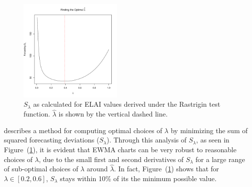 \documentclass{article}
\newcommand{\argmin}{\operatornamewithlimits{argmin}}
\begin{document}
%
%
\begin{figure}
\vspace{-0.2cm}
\includegraphics[width=0.45\textwidth]{./figures/ssRastHardOpt.pdf}
\caption{ 
$S_\lambda$ as calculated for ELAI values derived under the 
Rastrigin test function. $\hat\lambda$ is shown by the vertical dashed line. 
} 
\label{bestL} 
\end{figure}
%
%
\hspace*{1cm}\hspace*{-1.1cm}
%
\cite{boxBook} describes a method for computing optimal choices of $\lambda$ 
by minimizing the sum of squared forecasting deviations ($S_\lambda$).
Through this analysis of $S_\lambda$, as seen in Figure~(\ref{bestL}), it is 
evident that EWMA charts can be very robust to reasonable choices of 
$\lambda$, due to the small first and second derivatives of $S_\lambda$ for a 
large range of sub-optimal choices of $\lambda$ around $\hat\lambda$. In fact, 
Figure~(\ref{bestL}) shows that for \mbox{$\lambda\in[0.2, 0.6]$,} $S_\lambda$ 
stays within 10\% of its the minimum possible value.


%
\end{document}
